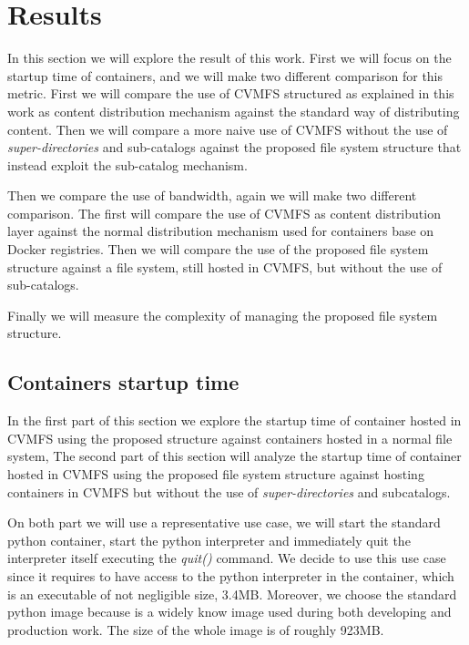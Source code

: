 \chapter{Results}\label{ch:Results}

In this section we will explore the result of this work. First we will focus on
the startup time of containers, and we will make two different comparison for
this metric. First we will compare the use of CVMFS structured as explained in
this work as content distribution mechanism against the standard way of
distributing content. Then we will compare a more naive use of CVMFS without
the use of \textit{super-directories} and sub-catalogs against the proposed
file system structure that instead exploit the sub-catalog mechanism. 

Then we compare the use of bandwidth, again we will make two different
comparison. The first will compare the use of CVMFS as content distribution
layer against the normal distribution mechanism used for containers base on
Docker registries. Then we will compare the use of the proposed file system
structure against a file system, still hosted in CVMFS, but without the use of
sub-catalogs. 

Finally we will measure the complexity of managing the proposed file system
structure.

\section{Containers startup time}

In the first part of this section we explore the startup time of container
hosted in CVMFS using the proposed structure against containers hosted in a
normal file system, The second part of this section will analyze the startup
time of container hosted in CVMFS using the proposed file system structure
against hosting containers in CVMFS but without the use of
\textit{super-directories} and subcatalogs.

On both part we will use a representative use case, we will start the standard
python container, start the python interpreter and immediately quit the
interpreter itself executing the \textit{quit()} command. We decide to use this
use case since it requires to have access to the python interpreter in the
container, which is an executable of not negligible size, 3.4MB. Moreover, we 
choose the standard python image because is a widely know image used during both
developing and production work. The size of the whole image is of roughly 923MB.

